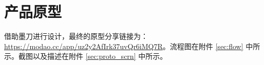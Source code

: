 \section{产品原型}

借助墨刀进行设计，最终的原型分享链接为：\url{https://modao.cc/app/uz2y2AfIrk37uvQr6iMQ7R}。流程图在附件 \ref{sec:flow} 中所示。截图以及描述在附件 \ref{sec:proto_scrn} 中所示。